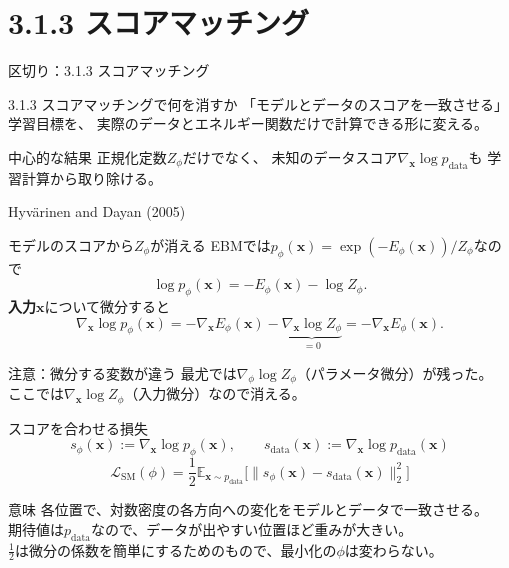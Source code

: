 \section{3.1.3 スコアマッチング}
\asmain
\begin{frame}{区切り：3.1.3 スコアマッチング}
    \tableofcontents[currentsection]
\end{frame}
\asmain
\begin{frame}{3.1.3 スコアマッチングで何を消すか}
    「モデルとデータのスコアを一致させる」学習目標を、
    実際のデータとエネルギー関数だけで計算できる形に変える。
    \begin{block}{中心的な結果}
        正規化定数$Z_\phi$だけでなく、
        未知のデータスコア$\nabla_{\bm{x}}\log p_{\mathrm{data}}$も
        学習計算から取り除ける。
    \end{block}
    \footnotesize
    Hyv\"{a}rinen and Dayan (2005)
\end{frame}
\asmain
\begin{frame}{モデルのスコアから$Z_\phi$が消える}
    EBMでは$p_\phi(\bm{x})=\exp(-E_\phi(\bm{x}))/Z_\phi$なので
    \[
        \log p_\phi(\bm{x})=-E_\phi(\bm{x})-\log Z_\phi.
    \]
    \textbf{入力}$\bm{x}$について微分すると
    \[
        \nabla_{\bm{x}}\log p_\phi(\bm{x})
        =
        -\nabla_{\bm{x}}E_\phi(\bm{x})
        -
        \underbrace{\nabla_{\bm{x}}\log Z_\phi}_{=0}
        =
        -\nabla_{\bm{x}}E_\phi(\bm{x}).
    \]
    \begin{block}{注意：微分する変数が違う}
        最尤では$\nabla_\phi\log Z_\phi$（パラメータ微分）が残った。\\
        ここでは$\nabla_{\bm{x}}\log Z_\phi$（入力微分）なので消える。
    \end{block}
\end{frame}
\asmain
\begin{frame}{スコアを合わせる損失}
    \[
        s_\phi(\bm{x}):=\nabla_{\bm{x}}\log p_\phi(\bm{x}),
        \qquad
        s_{\mathrm{data}}(\bm{x}):=\nabla_{\bm{x}}\log p_{\mathrm{data}}(\bm{x})
    \]
    \[
        \mathcal{L}_{\mathrm{SM}}(\phi)
        =
        \frac12
        \mathbb{E}_{\bm{x}\sim p_{\mathrm{data}}}
        \bigl[
        \|s_\phi(\bm{x})-s_{\mathrm{data}}(\bm{x})\|_2^2
        \bigr]
        \tag{3.1.3}
    \]
    \begin{block}{意味}
        各位置で、対数密度の各方向への変化をモデルとデータで一致させる。\\
        期待値は$p_{\mathrm{data}}$なので、データが出やすい位置ほど重みが大きい。\\
        $\frac12$は微分の係数を簡単にするためのもので、最小化の$\phi$は変わらない。
    \end{block}
\end{frame}

